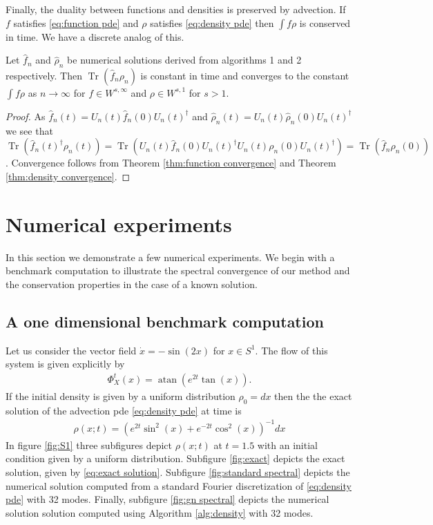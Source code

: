 \documentclass[final,leqno]{siamltex1213}
\DeclareMathOperator{\Tr}{Tr}
\begin{document}
Finally, the duality between functions and densities is preserved by advection.  If $f$ satisfies \eqref{eq:function pde} and $\rho $ satisfies \eqref{eq:density pde} then $\int f \rho$ is conserved in time.
We have a discrete analog of this.
\begin{theorem}
	Let $\hat{f}_{n}$ and $\hat{\rho}_{n}$ be numerical solutions derived from algorithms 1 and 2 respectively.
	Then $\Tr( \hat{f}_{n} \rho_{n} )$ is constant in time and converges to the constant $\int f \rho$ as $n \to \infty$
	for $f \in W^{s,\infty}$ and $\rho \in W^{s,1}$ for $s>1$.
\end{theorem}
\begin{proof}
	As $\hat{f}_{n}(t) = U_{n}(t) \hat{f}_{n}(0) U_{n}(t)^{\dagger}$ and $\hat{\rho}_{n}(t) = U_{n}(t) \hat{\rho}_{n}(0) U_{n}(t)^{\dagger}$
	we see that $\Tr( \hat{f}_{n}(t)^{\dagger} \rho_{n}(t) ) = \Tr( U_{n}(t) \hat{f}_{n}(0) U_{n}(t)^{\dagger} U_{n}(t) \rho_{n}(0) U_{n}(t)^{\dagger}) = \Tr( \hat{f}_{n} \rho_{n}(0) )$.
	Convergence follows from Theorem \ref{thm:function convergence} and Theorem \ref{thm:density convergence}.
\end{proof}

\section{Numerical experiments}

In this section we demonstrate a few numerical experiments.  We begin with a benchmark computation to illustrate the spectral convergence of our method and the conservation properties in the case of a known solution.

\subsection{A one dimensional benchmark computation}
Let us consider the vector field $\dot{x} = -\sin(2 x)$ for $x \in S^{1}$.
The flow of this system is given explicitly by
\begin{align}
	\Phi_{X}^{t}(x) = \operatorname{atan} \left( e^{2t} \tan( x) \right).
\end{align}
If the initial density is given by a uniform distribution $\rho_{0} = dx$ then the the exact solution of the advection pde \eqref{eq:density pde} at time is
\begin{align}
	\rho(x;t) =  \left( e^{2t} \sin^{2}(x) + e^{-2t} \cos^{2}(x) \right)^{-1}  dx \label{eq:exact solution}
\end{align}
 In figure \ref{fig:S1} three subfigures depict $\rho(x;t)$ at $t=1.5$ with an initial condition given by a uniform distribution.
Subfigure \ref{fig:exact} depicts the exact solution, given by \eqref{eq:exact solution}.  Subfigure \ref{fig:standard spectral} depicts the numerical solution computed
from a standard Fourier discretization of \eqref{eq:density pde} with 32 modes.
Finally, subfigure \ref{fig:gn spectral} depicts the numerical solution solution computed using Algorithm \ref{alg:density} with 32 modes.
\end{document}
